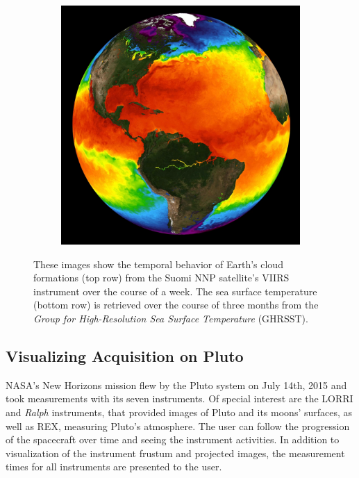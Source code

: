 \documentclass[journal]{vgtc}                %
\begin{document}
\begin{figure}[b]
\begin{subfigure}[tb]{0.32\linewidth}
	\end{subfigure}
    \begin{subfigure}[tb]{0.32\linewidth}
    	\includegraphics[width=\textwidth]{earth_temporal/earth_temporal_sea_surface3.png}
	\end{subfigure}
    \caption{These images show the temporal behavior of Earth's cloud formations (top row) from the Suomi NNP satellite's VIIRS instrument over the course of a week. The sea surface temperature (bottom row) is retrieved over the course of three months from the \emph{Group for High-Resolution Sea Surface Temperature} (GHRSST).}  \vspace{-4mm}
    \label{fig:temporal_earth}
\end{figure}

\fi

\subsection{Visualizing Acquisition on Pluto}
NASA's New Horizons mission flew by the Pluto system on July 14th, 2015 and took measurements with its seven instruments.
Of special interest are the LORRI and \emph{Ralph} instruments, that provided images of Pluto and its moons' surfaces, as well as REX, measuring Pluto's atmosphere.
The user can follow the progression of the spacecraft over time and seeing the instrument activities.
In addition to visualization of the instrument frustum and projected images, the measurement times for all instruments are presented to the user. 
\end{document}
